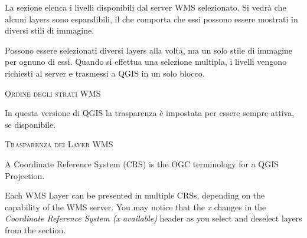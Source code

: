 
La sezione  elenca i livelli disponibili dal server WMS
selezionato. Si vedrà che alcuni layers sono espandibili, il che comporta che
essi possono essere mostrati in diversi stili di immagine.

Possono essere selezionati diversi layers alla volta, ma un solo stile di
immagine per ognuno di essi. Quando si effettua una selezione multipla, i
livelli vengono richiesti al server e trasmessi a QGIS in un solo blocco.

\begin{Tip}[ht]\caption{\textsc{Ordine degli strati WMS}}
\end{Tip}

\label{ogc-wms-transparency}

In questa versione di QGIS la trasparenza è impostata per essere sempre
attiva, se disponibile.

\begin{Tip}[ht]\caption{\textsc{Trasparenza dei Layer WMS}}
\end{Tip}


A Coordinate Reference System (CRS) is the OGC terminology for a QGIS Projection.

Each WMS Layer can be presented in multiple CRSs, depending
on the capability of the WMS server.  You may notice that the \textsl{x} changes in
the \textsl{Coordinate Reference System (x available)} header as you
select and deselect layers from the  section.

